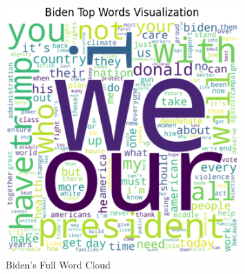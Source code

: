 \documentclass{article}
\begin{document}
\begin{figure}[H]
    \centering
    \includegraphics[width=9cm]{BidenWordCloudCrop.png}
    \caption{Biden's Full Word Cloud}
    \label{fig:bidenFull}
\end{figure}
\end{document}
